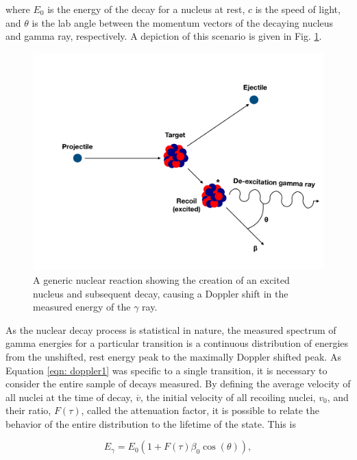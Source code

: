 \noindent where $E_{0}$ is the energy of the decay for a nucleus at rest, $c$ is the speed of light, and $\theta$ is the lab angle between the momentum vectors of the decaying nucleus and gamma ray, respectively. A depiction of this scenario is given in Fig. \ref{fig: decay}.

\begin{figure}
\includegraphics[width=\linewidth]{figures/decay.pdf}
\caption{A generic nuclear reaction showing the creation of an excited nucleus and subsequent decay, causing a Doppler shift in the measured energy of the $\gamma$ ray.}
\label{fig: decay}
\end{figure}


As the nuclear decay process is statistical in nature, the measured spectrum of gamma energies for a particular transition is a continuous distribution of energies from the unshifted, rest energy peak to the maximally Doppler shifted peak. As Equation \ref{eqn: doppler1} was specific to a single transition, it is necessary to consider the entire sample of decays measured. By defining the average velocity of all nuclei at the time of decay, $\overline{v}$, the initial velocity of all recoiling nuclei, $v_{0}$, and their ratio, $F(\tau)$, called the attenuation factor, it is possible to relate the behavior of the entire distribution to the lifetime of the state. This is 

\begin{equation}
E_{\gamma} = E_{0} \left(1 + F(\tau) \beta_{0} \cos (\theta)   \right),
\label{eqn: dopplerFull}
\end{equation}

